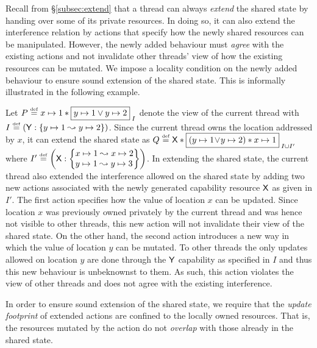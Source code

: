 Recall from \S\ref{subsec:extend} that a thread can always \emph{extend} the shared state by handing over some of its private resources. In doing so, it can also extend the interference relation by actions that specify how the newly shared resources can be manipulated. However, the newly added behaviour must \emph{agree} with the existing actions and not invalidate other threads' view of how the existing resources can be mutated. We impose a locality condition on the newly added behaviour to ensure sound extension of the shared state. This is informally illustrated in the following example. 
%
\begin{example}\label{ex:badExtension}
Let $P \eqdef \cell{x}{1} * \shared{\cell{y}{1} \lor \cell{y}{2}}{I}$ denote the view of the current thread with $I \mathrel{\stackrel{\smash{\scriptscriptstyle{\mathrm{def}}}}{=}} \left(\mathsf{Y}: \left\{y \mapsto 1 \mathrel{\leadsto} y \mapsto 2\right\} \right)$. Since the current thread owns the location addressed by $x$, it can extend the shared state as $Q \eqdef \token{X} * \shared{\left(\cell{y}{1} \!\lor\! \cell{y}{2} \right) * \cell{x}{1}}{I \cup I'}$ where 
$
	I' \eqdef 
		\left(
			\token{X}: 
			\left\{
			\begin{array}{@{}l@{}} 
				\cell{x}{1} \swap \cell{x}{2}\\
				\cell{y}{1} \swap \cell{y}{3}
			\end{array}
			\right\}
		 \right)
$.
In extending the shared state, the current thread also extended the interference allowed on the shared state by adding two new actions associated with the newly generated capability resource $\mathsf{X}$ as given in $I'$. The first action specifies how the value of location $x$ can be updated. Since location $x$ was previously owned privately by the current thread and was hence not visible to other threads, this new action will not invalidate their view of the shared state. On the other hand, the second action introduces a new way in which the value of location $y$ can be mutated. To other threads the only updates allowed on location $y$ are done through the $\mathsf{Y}$ capability as specified in $I$ and thus this new behaviour is unbeknownst to them. As such, this action violates the view of other threads and does not agree with the existing interference.
\end{example}
%
%
In order to ensure sound extension of the shared state, we require that the \emph{update footprint} of extended actions are confined to the locally owned resources. That is, the resources mutated by the action do not \emph{overlap} with those already in the shared state.  
